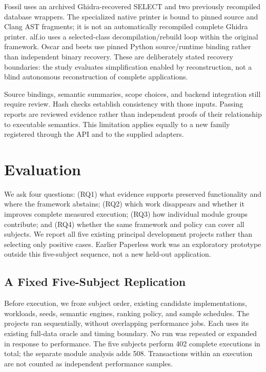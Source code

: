 \documentclass[acmsmall,screen,review,anonymous]{acmart}
\begin{document}
Fossil uses an archived Ghidra-recovered SELECT and two previously recompiled
database wrappers. The specialized native printer is bound to pinned source
and Clang AST fragments; it is not an automatically recompiled complete Ghidra
printer. alf.io uses a selected-class decompilation/rebuild loop within the
original framework. Oscar and beets use pinned Python source/runtime binding
rather than independent binary recovery. These are deliberately stated recovery boundaries: the study
evaluates simplification enabled by reconstruction, not a blind autonomous
reconstruction of complete applications.

Source bindings, semantic summaries, scope choices, and backend integration
still require review. Hash checks establish consistency with those inputs.
Passing reports are reviewed evidence rather than independent proofs of their
relationship to executable semantics. This limitation applies equally to a
new family registered through the API and to the supplied adapters.

\section{Evaluation}
\label{sec:evaluation}
We ask four questions: (RQ1) what evidence supports preserved functionality and
where the framework abstains; (RQ2) which work disappears and whether it improves
complete measured execution; (RQ3) how individual module groups contribute; and
(RQ4) whether the same framework and policy can cover all subjects. We report
all five existing principal development projects rather than selecting only
positive cases. Earlier Paperless work was an exploratory prototype outside
this five-subject sequence, not a new held-out application.

\subsection{A Fixed Five-Subject Replication}
Before execution, we froze subject order, existing candidate implementations,
workloads, seeds, semantic engines, ranking policy, and sample schedules. The
projects ran sequentially, without overlapping performance jobs. Each uses its
existing full-data oracle and timing boundary. No run was repeated or expanded
in response to performance. The five subjects perform 402 complete executions
in total; the separate module analysis adds 508. Transactions within an execution
are not counted as independent performance samples.
\end{document}
